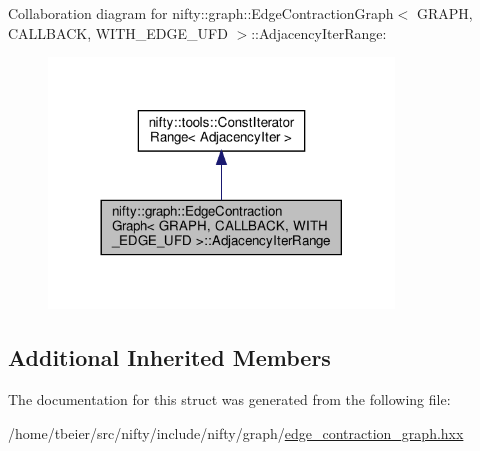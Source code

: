 Collaboration diagram for nifty\+:\+:graph\+:\+:Edge\+Contraction\+Graph$<$ G\+R\+A\+PH, C\+A\+L\+L\+B\+A\+CK, W\+I\+T\+H\+\_\+\+E\+D\+G\+E\+\_\+\+U\+FD $>$\+:\+:Adjacency\+Iter\+Range\+:
\nopagebreak
\begin{figure}[H]
\begin{center}
\leavevmode
\includegraphics[width=260pt]{structnifty_1_1graph_1_1EdgeContractionGraph_1_1AdjacencyIterRange__coll__graph}
\end{center}
\end{figure}
\subsection*{Additional Inherited Members}


The documentation for this struct was generated from the following file\+:\begin{DoxyCompactItemize}
\item 
/home/tbeier/src/nifty/include/nifty/graph/\hyperlink{graph_2edge__contraction__graph_8hxx}{edge\+\_\+contraction\+\_\+graph.\+hxx}\end{DoxyCompactItemize}
